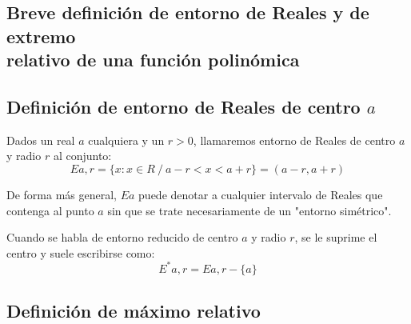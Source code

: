\documentclass[12pt]{article}
\begin{document}
\subsection{
  Breve definición de entorno de Reales y de extremo \\ relativo de una función polinómica
}

\subsection*{Definición de entorno de Reales de centro $a$}
Dados un real $a$ cualquiera y un $r>0$, llamaremos entorno de Reales de centro $a$ y radio $r$ al conjunto:
$$Ea,r=\{x:x\in R \ / \  a-r<x<a+r\}=(a-r, a+r)$$

De forma más general, $Ea$ puede denotar a cualquier intervalo de Reales que contenga al punto $a$ sin que se trate necesariamente de un "entorno simétrico".

Cuando se habla de entorno reducido de centro $a$ y radio $r$, se le suprime el centro y suele escribirse como:
$$ {E}^*a,r = Ea,r - \{a\} $$

\subsection*{Definición de máximo relativo}

\end{document}
